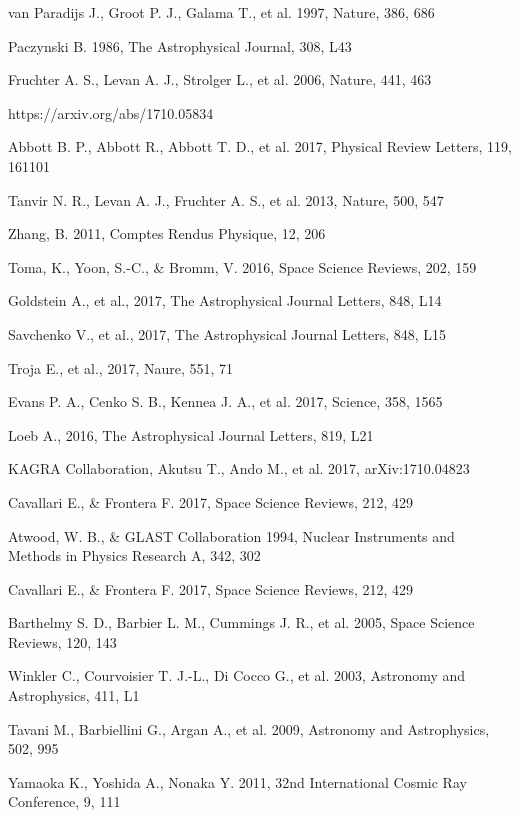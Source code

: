 \documentclass[12pt, a4paper,titlepage]{article}
\numberwithin{equation}{section}
\numberwithin{figure}{section}
\begin{document}
\begin{thebibliography}{99}
 van Paradijs J., Groot P. J., Galama T., et al. 1997, Nature, 386, 686

 Paczynski B. 1986, The Astrophysical Journal, 308, L43

 Fruchter A. S., Levan A. J., Strolger L., et al. 2006, Nature, 441, 463

 https://arxiv.org/abs/1710.05834

 Abbott B. P., Abbott R., Abbott T. D., et al. 2017, Physical Review Letters, 119, 161101

 Tanvir N. R., Levan A. J., Fruchter A. S., et al. 2013, Nature, 500, 547

 Zhang, B. 2011, Comptes Rendus Physique, 12, 206

 Toma, K., Yoon, S.-C., \& Bromm, V. 2016, Space Science Reviews, 202, 159

 Goldstein A., et al., 2017, The Astrophysical Journal Letters, 848, L14

 Savchenko V., et al., 2017, The Astrophysical Journal Letters, 848, L15

 Troja E., et al., 2017, Naure, 551, 71

 Evans P. A., Cenko S. B., Kennea J. A., et al. 2017, Science, 358, 1565

 Loeb A., 2016, The Astrophysical Journal Letters, 819, L21

 KAGRA Collaboration, Akutsu T., Ando M., et al. 2017, arXiv:1710.04823

 Cavallari E., \& Frontera F. 2017, Space Science Reviews, 212, 429
 
 Atwood, W. B., \& GLAST Collaboration 1994, Nuclear Instruments and Methods in Physics Research
A, 342, 302

 Cavallari E., \& Frontera F. 2017, Space Science Reviews, 212, 429

 Barthelmy S. D., Barbier L. M., Cummings J. R., et al. 2005, Space Science Reviews, 120, 143

 Winkler C., Courvoisier T. J.-L., Di Cocco G., et al. 2003, Astronomy and Astrophysics, 411, L1

 Tavani M., Barbiellini G., Argan A., et al. 2009, Astronomy and Astrophysics, 502, 995

 Yamaoka K., Yoshida A., Nonaka Y. 2011, 32nd International Cosmic Ray Conference, 9, 111


\end{thebibliography}
\end{document}
